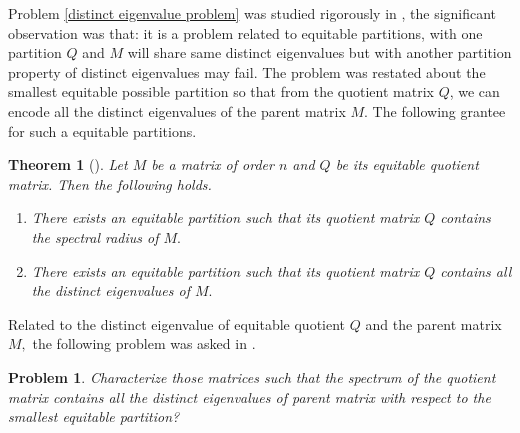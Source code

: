 \documentclass[12pt,twoside]{article}
\newtheorem{theorem}{Theorem}[section]
\newtheorem{problem}{Problem}
\begin{document}
Problem \ref{distinct eigenvalue problem} was studied rigorously in \cite{bilalijpam}, the significant observation was that: it is a problem related to  equitable partitions, with one partition $Q$ and $M$ will share same distinct eigenvalues but with another partition property of distinct eigenvalues may fail. The problem was restated about the smallest equitable possible partition so that from the quotient matrix $Q$, we can encode all the distinct eigenvalues of the parent matrix $M.$ The following grantee for such a equitable partitions. 
\begin{theorem}[\cite{bilalijpam}]\label{theorem eqitable quotient matrix contains all the eigenvalues with some partition}
	Let $ M $ be a matrix of order $ n $ and $ Q $ be its equitable quotient matrix. Then the following holds.
	\begin{enumerate}
		\item There exists an equitable partition such that its quotient matrix $ Q $ contains the spectral radius of $ M. $
		\item There exists an equitable partition such that its quotient matrix $ Q $ contains all the distinct eigenvalues of $ M. $
	\end{enumerate}
\end{theorem}

Related to the distinct eigenvalue of equitable quotient $Q$ and the parent matrix $M,$ the following problem was asked in \cite{bilalijpam}.
\begin{problem}\label{problem distinct 2}
	Characterize those matrices such that the spectrum of the quotient matrix contains all the distinct eigenvalues of parent matrix with respect to the smallest equitable partition?
\end{problem}
\end{document}
